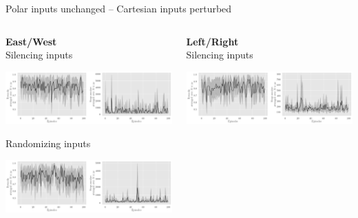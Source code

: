 \documentclass[bigger]{beamer}
\begin{document}
\begin{frame}[label={sec:org4507a69}]{Polar inputs unchanged -- Cartesian inputs perturbed}
\begin{columns}
\begin{column}[c]{0.5\columnwidth}
\begin{center}
\small
\textbf{East/West}\\
\footnotesize
Silencing inputs
\end{center}
\begin{center}
\includegraphics[width=\textwidth]{medias/EastWest/exp_keep-polar_silence-True.png}
\end{center}
\begin{center}
\footnotesize
Randomizing inputs
\end{center}
\begin{center}
\includegraphics[width=\textwidth]{medias/EastWest/exp_keep-polar_silence-False.png}
\end{center}
\end{column}
\begin{column}[c]{0.5\columnwidth}
\begin{center}
\small
\textbf{Left/Right}\\
\footnotesize
Silencing inputs
\end{center}
\begin{center}
\includegraphics[width=\textwidth]{medias/LeftRight/exp_keep-polar_silence-True.png}

\end{center}
\end{column}
\end{columns}
\end{frame}
\end{document}
